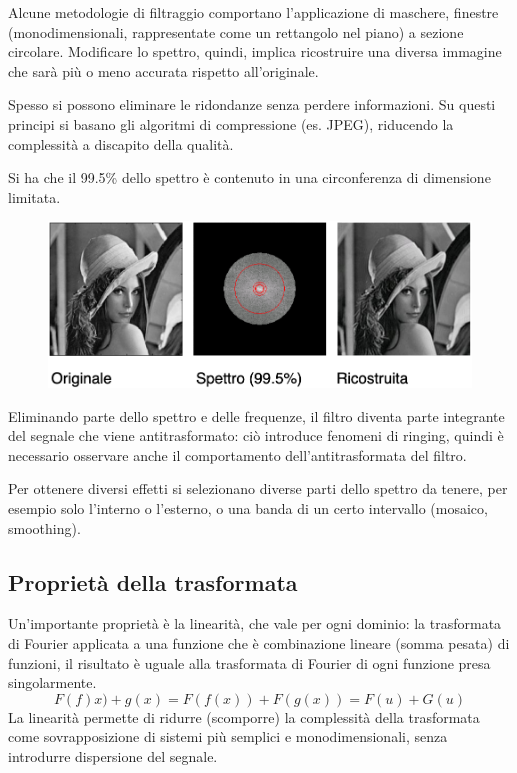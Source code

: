Alcune metodologie di filtraggio comportano l'applicazione di maschere, finestre (monodimensionali, rappresentate come un rettangolo nel piano) a sezione circolare. Modificare lo spettro, quindi, implica ricostruire una diversa immagine che sarà più o meno accurata rispetto all'originale. 

Spesso si possono eliminare le ridondanze senza perdere informazioni. Su questi principi si basano gli algoritmi di compressione (es. JPEG), riducendo la complessità a discapito della qualità.

Si ha che il 99.5\% dello spettro è contenuto in una circonferenza di dimensione limitata.
\begin{figure}[h]
	\centering
	\includegraphics[scale=0.45]{Lezioni/Immagini/spettro}
\end{figure}

Eliminando parte dello spettro e delle frequenze, il filtro diventa parte integrante del segnale che viene antitrasformato: ciò introduce fenomeni di ringing, quindi è necessario osservare anche il comportamento dell'antitrasformata del filtro. 

Per ottenere diversi effetti si selezionano diverse parti dello spettro da tenere, per esempio solo l'interno o l'esterno, o una banda di un certo intervallo (mosaico, smoothing). 

\subsection{Proprietà della trasformata}
Un'importante proprietà è la linearità, che vale per ogni dominio: la trasformata di Fourier applicata a una funzione che è combinazione lineare (somma pesata) di funzioni, il risultato è uguale alla trasformata di Fourier di ogni funzione presa singolarmente. 
$$F(f)x) + g(x) = F(f(x)) + F(g(x)) = F(u) + G(u)$$
La linearità permette di ridurre (scomporre) la complessità della trasformata come sovrapposizione di sistemi più semplici e monodimensionali, senza introdurre dispersione del segnale.

